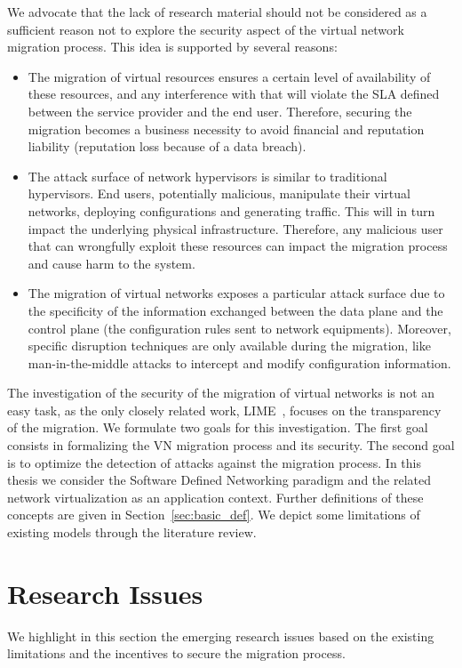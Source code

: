 We advocate that the lack of research material should not be considered as a sufficient reason not to explore the security aspect of the virtual network migration process. This idea is supported by several reasons:

\begin{itemize}
    
    \item The migration of virtual resources ensures a certain level of availability of these resources, and any interference with that will violate the SLA defined between the service provider and the end user.
    Therefore, securing the migration becomes a business necessity to avoid financial and reputation liability (\eg reputation loss because of a data breach).
    
    \item The attack surface of network hypervisors is similar to traditional hypervisors. End users, potentially malicious, manipulate their virtual networks, deploying configurations and generating traffic. This will in turn impact the underlying physical infrastructure. Therefore, any malicious user that can wrongfully exploit these resources can impact the migration process and cause harm to the system.

    \item The migration of virtual networks exposes a particular attack surface due to the specificity of the information exchanged between the data plane and the control plane (\eg the configuration rules sent to network equipments). Moreover, specific disruption techniques are only available during the migration, like man-in-the-middle attacks to intercept and modify configuration information.  
\end{itemize}

The investigation of the security of the migration of virtual networks is not an easy task, as the only closely related work, LIME~\cite{Lime-Ghorbani2014}, focuses on the transparency of the migration. 
We formulate two goals for this investigation.
The first goal consists in formalizing the VN migration process and its security.
The second goal is to optimize the detection of attacks against the migration process. In this thesis we consider the Software Defined Networking paradigm and the related network virtualization as an application context. Further definitions of these concepts are given in Section~\ref{sec:basic_def}. 
We depict some limitations of existing models through the literature review.


\section{Research Issues}
We highlight in this section the emerging research issues based on the existing limitations and the incentives to secure the migration process.


